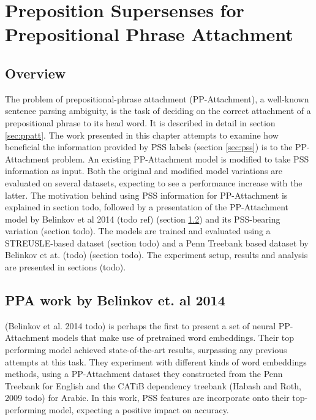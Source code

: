 
\chapter{Preposition Supersenses for  Prepositional Phrase Attachment} %

\label{Chapter3} %


\section{Overview}

The problem of prepositional-phrase attachment (PP-Attachment), a well-known sentence parsing ambiguity, is the task of deciding on the correct attachment of a prepositional phrase to its head word. It is described in detail in section \ref{sec:ppatt}. The work presented in this chapter attempts to examine how beneficial the information provided by PSS labels (section \ref{sec:pss}) is to the PP-Attachment problem. An existing PP-Attachment model is modified to take PSS information as input. Both the original and modified model variations are evaluated on several datasets, expecting to see a performance increase with the latter. The motivation behind using PSS information for PP-Attachment is explained in section todo, followed by a presentation of the PP-Attachment model by Belinkov et al 2014 (todo ref) (section \ref{sec:ppatt-belinkov}) and its PSS-bearing variation (section todo). The models are trained and evaluated using a STREUSLE-based dataset (section todo) and a Penn Treebank based dataset by Belinkov et at. (todo) (section todo). The experiment setup, results and analysis are presented in sections (todo).

\section{PPA work by Belinkov et. al 2014} \label{sec:ppatt-belinkov}

(Belinkov et al. 2014 todo) is perhaps the first to present a set of neural PP-Attachment models that make use of pretrained word embeddings. Their top performing model achieved state-of-the-art results, surpassing any previous attempts at this task. They experiment with different kinds of word embeddings methods, using a PP-Attachment dataset they constructed from the Penn Treebank for English and the CATiB dependency treebank (Habash and Roth, 2009 todo) for Arabic. In this work, PSS features are incorporate onto their top-performing model, expecting a positive impact on accuracy. 

